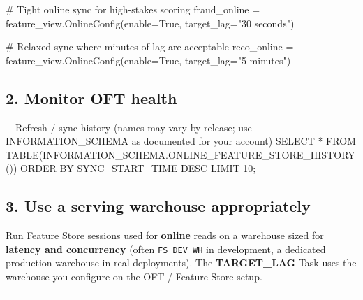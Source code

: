 \documentclass[
  letterpaper,
  DIV=11,
  numbers=noendperiod]{scrreprt}
\newenvironment{Shaded}{\begin{snugshade}}{\end{snugshade}}
\newcommand{\CommentTok}[1]{\textcolor[rgb]{0.37,0.37,0.37}{#1}}
\newcommand{\DecValTok}[1]{\textcolor[rgb]{0.68,0.00,0.00}{#1}}
\newcommand{\KeywordTok}[1]{\textcolor[rgb]{0.00,0.23,0.31}{#1}}
\newcommand{\NormalTok}[1]{\textcolor[rgb]{0.00,0.23,0.31}{#1}}
\newcommand{\OperatorTok}[1]{\textcolor[rgb]{0.37,0.37,0.37}{#1}}
\newcommand{\StringTok}[1]{\textcolor[rgb]{0.13,0.47,0.30}{#1}}
\newcommand{\VariableTok}[1]{\textcolor[rgb]{0.07,0.07,0.07}{#1}}
\begin{document}
\begin{Shaded}
\begin{Highlighting}[]
\CommentTok{\# Tight online sync for high{-}stakes scoring}
\NormalTok{fraud\_online }\OperatorTok{=}\NormalTok{ feature\_view.OnlineConfig(enable}\OperatorTok{=}\VariableTok{True}\NormalTok{, target\_lag}\OperatorTok{=}\StringTok{"30 seconds"}\NormalTok{)}

\CommentTok{\# Relaxed sync where minutes of lag are acceptable}
\NormalTok{reco\_online }\OperatorTok{=}\NormalTok{ feature\_view.OnlineConfig(enable}\OperatorTok{=}\VariableTok{True}\NormalTok{, target\_lag}\OperatorTok{=}\StringTok{"5 minutes"}\NormalTok{)}
\end{Highlighting}
\end{Shaded}

\hypertarget{monitor-oft-health}{%
\subsection{2. Monitor OFT health}\label{monitor-oft-health}}

\begin{Shaded}
\begin{Highlighting}[]
\CommentTok{{-}{-} Refresh / sync history (names may vary by release; use INFORMATION\_SCHEMA as documented for your account)}
\KeywordTok{SELECT} \OperatorTok{*}
\KeywordTok{FROM} \KeywordTok{TABLE}\NormalTok{(INFORMATION\_SCHEMA.ONLINE\_FEATURE\_STORE\_HISTORY())}
\KeywordTok{ORDER} \KeywordTok{BY}\NormalTok{ SYNC\_START\_TIME }\KeywordTok{DESC}
\KeywordTok{LIMIT} \DecValTok{10}\NormalTok{;}
\end{Highlighting}
\end{Shaded}

\hypertarget{use-a-serving-warehouse-appropriately}{%
\subsection{3. Use a serving warehouse
appropriately}\label{use-a-serving-warehouse-appropriately}}

Run Feature Store sessions used for \textbf{online} reads on a warehouse
sized for \textbf{latency and concurrency} (often \texttt{FS\_DEV\_WH}
in development, a dedicated production warehouse in real deployments).
The \textbf{TARGET\_LAG} Task uses the warehouse you configure on the
OFT / Feature Store setup.

\begin{center}\rule{0.5\linewidth}{0.5pt}\end{center}
\end{document}
